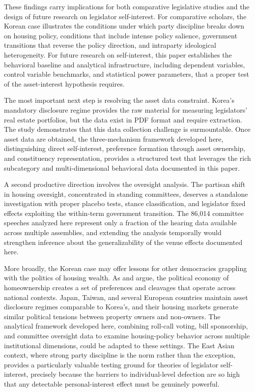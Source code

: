 \documentclass[11pt]{article}
\begin{document}
These findings carry implications for both comparative legislative studies and the design of future research on legislator self-interest. For comparative scholars, the Korean case illustrates the conditions under which party discipline breaks down on housing policy, conditions that include intense policy salience, government transitions that reverse the policy direction, and intraparty ideological heterogeneity. For future research on self-interest, this paper establishes the behavioral baseline and analytical infrastructure, including dependent variables, control variable benchmarks, and statistical power parameters, that a proper test of the asset-interest hypothesis requires.

The most important next step is resolving the asset data constraint. Korea's mandatory disclosure regime provides the raw material for measuring legislators' real estate portfolios, but the data exist in PDF format and require extraction. The \citet{seo2025} study demonstrates that this data collection challenge is surmountable. Once asset data are obtained, the three-mechanism framework developed here, distinguishing direct self-interest, preference formation through asset ownership, and constituency representation, provides a structured test that leverages the rich subcategory and multi-dimensional behavioral data documented in this paper.

A second productive direction involves the oversight analysis. The partisan shift in housing oversight, concentrated in standing committees, deserves a standalone investigation with proper placebo tests, stance classification, and legislator fixed effects exploiting the within-term government transition. The 86,014 committee speeches analyzed here represent only a fraction of the hearing data available across multiple assemblies, and extending the analysis temporally would strengthen inference about the generalizability of the venue effects documented here.

More broadly, the Korean case may offer lessons for other democracies grappling with the politics of housing wealth. As \citet{ansell2014} and \citet{schwartz2012} argue, the political economy of homeownership creates a set of preferences and cleavages that operate across national contexts. Japan, Taiwan, and several European countries maintain asset disclosure regimes comparable to Korea's, and their housing markets generate similar political tensions between property owners and non-owners. The analytical framework developed here, combining roll-call voting, bill sponsorship, and committee oversight data to examine housing-policy behavior across multiple institutional dimensions, could be adapted to these settings. The East Asian context, where strong party discipline is the norm rather than the exception, provides a particularly valuable testing ground for theories of legislator self-interest, precisely because the barriers to individual-level defection are so high that any detectable personal-interest effect must be genuinely powerful.
\end{document}
